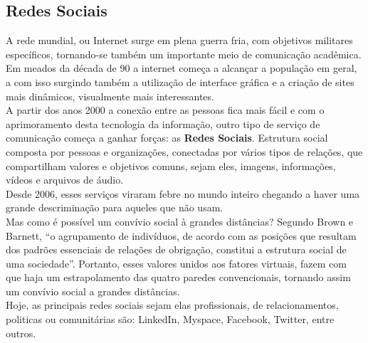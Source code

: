 \subsection{Redes Sociais}
A rede mundial, ou Internet surge em plena guerra fria, com objetivos militares específicos, tornando-se também um importante meio de comunicação acadêmica. Em meados da década de 90 a internet começa a alcançar a população em geral, a com isso surgindo também a utilização de interface gráfica e a criação de sites mais dinâmicos, visualmente mais interessantes.
\\
\indent
A partir dos anos 2000 a conexão entre as pessoas fica mais fácil e com o aprimoramento desta tecnologia da informação, outro tipo de serviço de comunicação começa a ganhar forças: as {\bf Redes Sociais}. Estrutura social composta por pessoas e organizações, conectadas por vários tipos de relações, que compartilham valores e objetivos comuns, sejam eles, imagens, informações, vídeos e arquivos de áudio.
\\
\indent
Desde 2006, esses serviços viraram febre no mundo inteiro chegando a haver uma grande descriminação para aqueles que não usam.
\\
\indent
Mas como é possível um convívio social à grandes distâncias? Segundo Brown e Barnett, “o agrupamento de indivíduos, de acordo com as posições que resultam dos padrões essenciais de relações de obrigação, constitui a estrutura social de uma sociedade”. Portanto, esses valores unidos aos fatores virtuais, fazem com que haja um estrapolamento das quatro paredes convencionais, tornando assim um convívio social a grandes distâncias.
\\
\indent
Hoje, as principais redes sociais sejam elas profissionais, de relacionamentos, politicas ou comunitárias são: LinkedIn, Myspace, Facebook, Twitter, entre outros.

